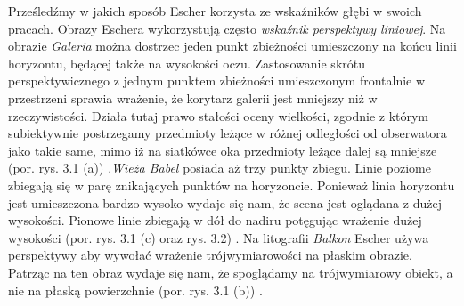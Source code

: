 \documentclass[licencjacka]{kdypl}
\begin{document}
Prześledźmy w jakich sposób Escher korzysta ze wskaźników głębi w swoich pracach.
Obrazy Eschera wykorzystują często \textit{wskaźnik perspektywy liniowej}. Na obrazie \textit{Galeria} można dostrzec jeden punkt zbieżności umieszczony na końcu linii horyzontu, będącej także na wysokości oczu. Zastosowanie skrótu perspektywicznego z jednym punktem zbieżności umieszczonym frontalnie w przestrzeni sprawia wrażenie, że korytarz galerii jest mniejszy niż w rzeczywistości. Działa tutaj  prawo stałości oceny wielkości, zgodnie z którym subiektywnie postrzegamy przedmioty leżące w różnej odległości od obserwatora jako takie same, mimo iż na siatkówce oka przedmioty leżące dalej są mniejsze (por. rys. 3.1 (a)) \citep[s. 32-33]{Deregowski}.\textit{Wieża Babel} posiada aż trzy punkty zbiegu. Linie poziome zbiegają się w parę znikających punktów na horyzoncie. Ponieważ linia horyzontu jest umieszczona bardzo wysoko wydaje się nam, że scena jest oglądana z dużej wysokości.  Pionowe linie zbiegają w dół do nadiru potęgując wrażenie dużej wysokości (por. rys. 3.1 (c) oraz rys. 3.2) \citep{EscherMath2006}. Na litografii \textit{Balkon} Escher używa perspektywy aby wywołać wrażenie trójwymiarowości na płaskim obrazie. Patrząc na ten obraz wydaje się nam, że spoglądamy na trójwymiarowy obiekt, a nie na płaską powierzchnie (por. rys. 3.1 (b)) \citep{EscherMath2006}.
\end{document}
